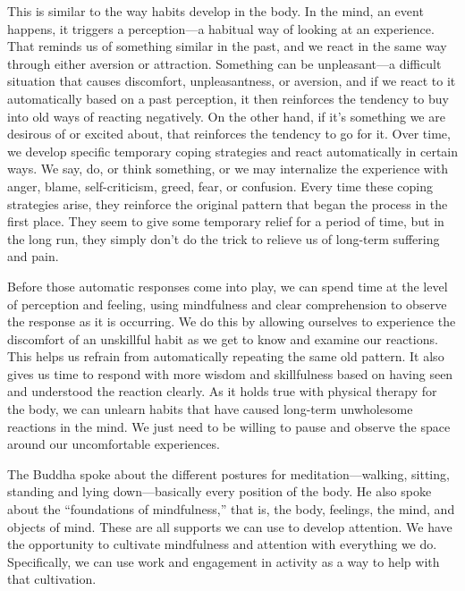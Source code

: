 This is similar to the way habits develop in the body. In the mind, an 
event happens, it triggers a perception---a habitual way of looking at 
an experience. That reminds us of something similar in the past, and we 
react in the same way through either aversion or attraction. Something 
can be unpleasant---a difficult situation that causes discomfort, 
unpleasantness, or aversion, and if we react to it automatically based 
on a past perception, it then reinforces the tendency to buy into old 
ways of reacting negatively. On the other hand, if it's something we 
are desirous of or excited about, that reinforces the tendency to go 
for it. Over time, we develop specific temporary coping strategies and 
react automatically in certain ways. We say, do, or think something, or 
we may internalize the experience with anger, blame, self-criticism, 
greed, fear, or confusion. Every time these coping strategies arise, 
they reinforce the original pattern that began the process in the first 
place. They seem to give some temporary relief for a period of time, 
but in the long run, they simply don't do the trick to relieve us of 
long-term suffering and pain.

Before those automatic responses come into play, we can spend time at 
the level of perception and feeling, using mindfulness and clear 
comprehension to observe the response as it is occurring. We do this by 
allowing ourselves to experience the discomfort of an unskillful habit 
as we get to know and examine our reactions. This helps us refrain from 
automatically repeating the same old pattern. It also gives us time to 
respond with more wisdom and skillfulness based on having seen and 
understood the reaction clearly. As it holds true with physical therapy 
for the body, we can unlearn habits that have caused long-term 
unwholesome reactions in the mind. We just need to be willing to pause 
and observe the space around our uncomfortable experiences.


The Buddha spoke about the different postures for meditation---walking, 
sitting, standing and lying down---basically every position of the 
body. He also spoke about the ``foundations of mindfulness,'' that is, 
the body, feelings, the mind, and objects of mind. These are all 
supports we can use to develop attention. We have the opportunity to 
cultivate mindfulness and attention with everything we do. 
Specifically, we can use work and engagement in activity as a way to 
help with that cultivation.


